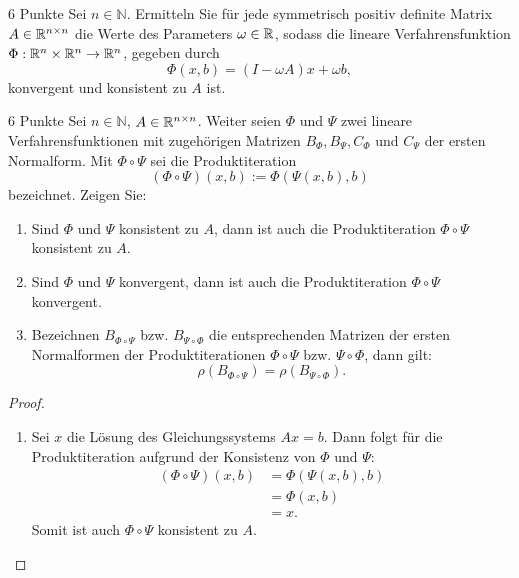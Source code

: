 \documentclass{problemset}
\begin{document}
\begin{problem}{6 Punkte}
Sei \( n \in \mathbb{N} \). Ermitteln Sie für jede symmetrisch positiv definite
Matrix \( A \in \mathbb{R}^{n \times n} \) die Werte des Parameters \( \omega
\in \mathbb{R} \), sodass die lineare Verfahrensfunktion \( \Phi: \mathbb{R}^n
\times \mathbb{R}^n \to \mathbb{R}^n \), gegeben durch
\[
    \Phi(x, b) = (I - \omega A)x + \omega b,
\]
konvergent und konsistent zu \( A \) ist.
\end{problem}

\begin{problem}[Lemma 6.8]{6 Punkte}
Sei \( n \in \mathbb{N} \), \( A \in \mathbb{R}^{n \times n} \). Weiter seien
\( \Phi \) und \( \Psi \) zwei lineare Verfahrensfunktionen mit zugehörigen
Matrizen \( B_\Phi, B_\Psi, C_\Phi \) und \( C_\Psi \) der ersten Normalform.
Mit \( \Phi \circ \Psi \) sei die Produktiteration
\[
    (\Phi \circ \Psi)(x, b) := \Phi(\Psi(x, b), b)
\]
bezeichnet. Zeigen Sie:
\begin{enumerate}
    \item Sind \( \Phi \) und \( \Psi \) konsistent zu \( A \), dann ist auch
          die Produktiteration \( \Phi \circ \Psi \) konsistent zu \( A \).
    \item Sind \( \Phi \) und \( \Psi \) konvergent, dann ist auch die
          Produktiteration \( \Phi \circ \Psi \) konvergent.
    \item Bezeichnen \( B_{\Phi \circ \Psi} \) bzw. \( B_{\Psi \circ \Phi} \)
          die entsprechenden Matrizen der ersten Normalformen der
          Produktiterationen \( \Phi \circ \Psi \) bzw. \( \Psi \circ \Phi \),
          dann gilt:
          \[
              \rho(B_{\Phi \circ \Psi}) = \rho(B_{\Psi \circ \Phi}).
          \]
\end{enumerate}
\begin{proof}\leavevmode
    \begin{enumerate}
        \item Sei \( x \) die Lösung des Gleichungssystems \( A x = b \). Dann
              folgt für die Produktiteration aufgrund der Konsistenz von \(
              \Phi \) und \( \Psi \):
              \begin{align*}
                  (\Phi \circ \Psi)(x, b) & = \Phi(\Psi(x, b), b) \\
                                          & = \Phi(x, b)          \\
                                          & = x.
              \end{align*}
              Somit ist auch \( \Phi \circ \Psi \) konsistent zu \( A \).


\end{enumerate}
\end{proof}
\end{problem}
\end{document}
